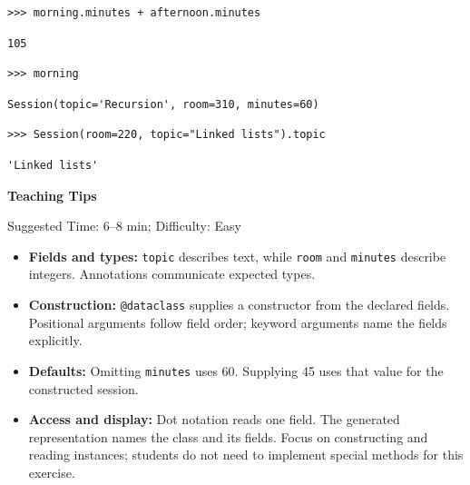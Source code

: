 \begin{blocksection}
\begin{lstlisting}
>>> morning.minutes + afternoon.minutes
\end{lstlisting}
\begin{solution}[.35in]
\begin{lstlisting}
105
\end{lstlisting}
\end{solution}
\end{blocksection}

\begin{blocksection}
\begin{lstlisting}
>>> morning
\end{lstlisting}
\begin{solution}[.35in]
\begin{lstlisting}
Session(topic='Recursion', room=310, minutes=60)
\end{lstlisting}
\end{solution}
\end{blocksection}

\begin{blocksection}
\begin{lstlisting}
>>> Session(room=220, topic="Linked lists").topic
\end{lstlisting}
\begin{solution}[.35in]
\begin{lstlisting}
'Linked lists'
\end{lstlisting}
\end{solution}
\end{blocksection}

\begin{questionmeta}
\textbf{Teaching Tips}\par\nopagebreak[4]
Suggested Time: 6--8 min; Difficulty: Easy
\nopagebreak[4]
\begin{itemize}
    \item \textbf{Fields and types:} \lstinline{topic} describes text, while \lstinline{room} and \lstinline{minutes} describe integers. Annotations communicate expected types.
    \item \textbf{Construction:} \lstinline{@dataclass} supplies a constructor from the declared fields. Positional arguments follow field order; keyword arguments name the fields explicitly.
    \item \textbf{Defaults:} Omitting \lstinline{minutes} uses 60. Supplying 45 uses that value for the constructed session.
    \item \textbf{Access and display:} Dot notation reads one field. The generated representation names the class and its fields. Focus on constructing and reading instances; students do not need to implement special methods for this exercise.
\end{itemize}
\end{questionmeta}
